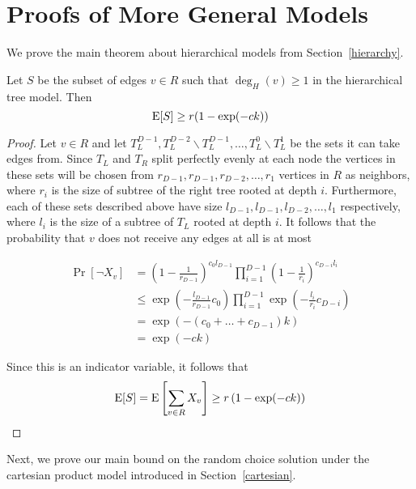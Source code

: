 \section{Proofs of More General Models}\label{sec:appendix}

\setcounter{thm}{9}
We prove the main theorem about hierarchical models from Section~\ref{hierarchy}.
\begin{thm}
Let $S$ be the subset of edges $v\in R$ such that $\deg_H(v) \geq 1$ in the hierarchical tree model. Then
\[ \text{E}[S] \geq r(1-\exp(-ck)) \]
\end{thm}

\begin{proof}
Let $v\in R$ and let $T_L^{D-1}, T_L^{D-2}\backslash T_L^{D-1},
\ldots, T_L^0\backslash T_L^1$ be the sets it can take edges
from. Since $T_L$ and $T_R$ split perfectly evenly at each node the
vertices in these sets will be chosen from $r_{D-1}, r_{D-1},
r_{D-2},\ldots, r_{1}$ vertices in $R$ as neighbors,
where $r_i$ is the size of subtree of the right tree rooted at depth
$i$. Furthermore, each of these sets described above have size
$l_{D-1}, l_{D-1}, l_{D-2}, \ldots, l_{1}$ respectively, where $l_i$
is the size of a subtree of $T_L$ rooted at depth $i$. It follows that
the probability that $v$ does not receive any edges at all is at most

\begin{align*}
	      \Pr[\lnot X_v]
	&=    \left(1-\frac{1}{r_{D-1}}\right)^{c_0l_{D-1}}\prod_{i=1}^{D-1}\left(1 - \frac{1}{r_i}\right)^{c_{D-i} l_i} \\
	&\leq \exp\left(-\frac{l_{D-1}}{r_{D-1}}c_0\right)\prod_{i=1}^{D-1} \exp\left(-\frac{l_i}{r_i}c_{D-i}\right) \\
	&=    \exp\left(-(c_0 + \ldots + c_{D-1})k\right) \\
	&=    \exp(-ck)
\end{align*}

Since this is an indicator variable, it follows that
\[ \text{E}[S] = \text{E}\left[\sum_{v \in R} X_v \right] \geq r \left(1-\exp(-ck)\right) \]
\end{proof}

Next, we prove our main bound on the random choice solution under the cartesian product model introduced in Section~\ref{cartesian}.

